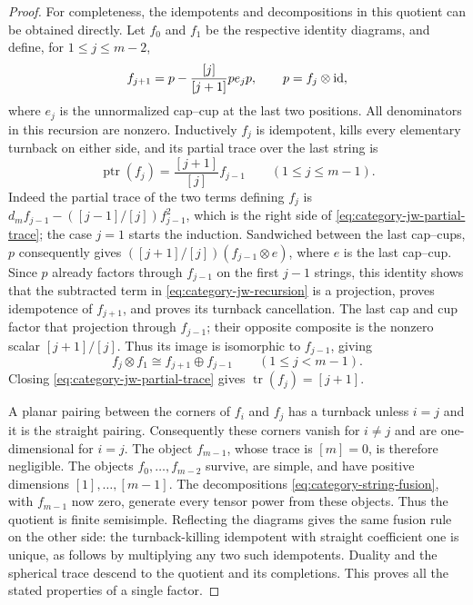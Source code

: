 \begin{proof}
For completeness, the idempotents and decompositions in this quotient
can be obtained directly. Let $f_0$ and $f_1$ be the respective identity
diagrams, and define, for $1\leq j\leq m-2$,
\begin{equation}
 f_{j+1}=p-\frac{[j]}{[j+1]}p e_jp,
 \qquad p=f_j\otimes\operatorname{id},
 \label{eq:category-jw-recursion}
\end{equation}
where $e_j$ is the unnormalized cap--cup at the last two positions.
All denominators in this recursion are nonzero. Inductively $f_j$ is
idempotent, kills every elementary turnback on either side, and its
partial trace over the last string is
\begin{equation}
 \operatorname{ptr}(f_j)=\frac{[j+1]}{[j]}f_{j-1}
 \qquad(1\leq j\leq m-1).
 \label{eq:category-jw-partial-trace}
\end{equation}
Indeed the partial trace of the two terms defining $f_j$ is
$d_m f_{j-1}-([j-1]/[j])f_{j-1}^2$, which is the right side of
\eqref{eq:category-jw-partial-trace}; the case $j=1$ starts the
induction. Sandwiched between the last cap--cups, $p$ consequently gives
$([j+1]/[j])(f_{j-1}\otimes e)$, where $e$ is the last cap--cup.
Since $p$ already factors through $f_{j-1}$ on the first $j-1$ strings,
this identity shows that the subtracted term in
\eqref{eq:category-jw-recursion} is a projection, proves idempotence
of $f_{j+1}$, and proves its turnback cancellation. The last cap and cup
factor that projection through $f_{j-1}$; their opposite composite is
the nonzero scalar $[j+1]/[j]$. Thus its image is isomorphic to
$f_{j-1}$, giving
\begin{equation}
 f_j\otimes f_1\cong f_{j+1}\oplus f_{j-1}
 \qquad(1\leq j<m-1).
 \label{eq:category-string-fusion}
\end{equation}
Closing \eqref{eq:category-jw-partial-trace} gives
$\operatorname{tr}(f_j)=[j+1]$.

A planar pairing between the corners of $f_i$ and $f_j$ has a turnback
unless $i=j$ and it is the straight pairing. Consequently these corners
vanish for $i\ne j$ and are one-dimensional for $i=j$. The object
$f_{m-1}$, whose trace is $[m]=0$, is therefore negligible. The objects
$f_0,\ldots,f_{m-2}$ survive, are simple, and have positive dimensions
$[1],\ldots,[m-1]$. The decompositions
\eqref{eq:category-string-fusion}, with $f_{m-1}$ now zero, generate
every tensor power from these objects. Thus the quotient is finite
semisimple. Reflecting the diagrams gives the same fusion rule on the
other side: the turnback-killing idempotent with straight coefficient
one is unique, as follows by multiplying any two such idempotents.
Duality and the spherical trace descend to the quotient and its
completions. This proves all the stated properties of a single factor.


\end{proof}
